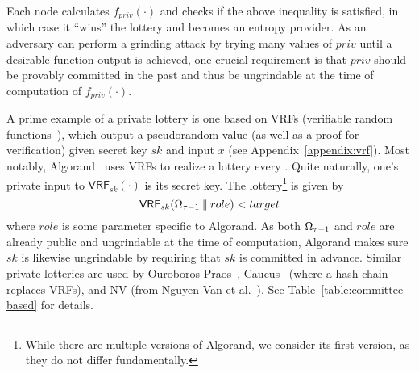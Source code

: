 Each node calculates $f_{priv}(\cdot)$ and checks if the above inequality is satisfied, in which case it ``wins'' the lottery and becomes an entropy provider. As an adversary can perform a grinding attack by trying many values of $priv$ until a desirable function output is achieved, one crucial requirement is that $priv$ should be provably committed in the past and thus be ungrindable at the time of computation of $f_{priv}(\cdot)$.

A prime example of a private lottery is one based on VRFs (verifiable random functions~\cite{micali1999verifiable,dodis2005verifiable}), which output a pseudorandom value (as well as a proof for verification) given secret key $sk$ and input $x$ (see Appendix~\ref{appendix:vrf}).
Most notably, Algorand~\cite{gilad2017algorand} uses VRFs to realize a lottery every \epoch. Quite naturally, one's private input to $\textsf{VRF}_{sk}(\cdot)$ is its secret key. The lottery\footnote{While there are multiple versions of Algorand, we consider its first version, as they do not differ fundamentally.} is given by
\[
\textsf{VRF}_{sk}(\Omega_{\tau - 1} \mathbin\Vert role) < target
\]
where $role$ is some parameter specific to Algorand. As both $\Omega_{\tau - 1}$ and $role$ are already public and ungrindable at the time of computation, Algorand makes sure $sk$ is likewise ungrindable by requiring that $sk$ is committed in advance. Similar private lotteries are used by Ouroboros Praos~\cite{david2018ouroboros}, Caucus~\cite{azouvi2018winning} (where a hash chain replaces VRFs), and NV (from Nguyen-Van et al.~\cite{nguyen2019scalable}). See Table~\ref{table:committee-based} for details.


